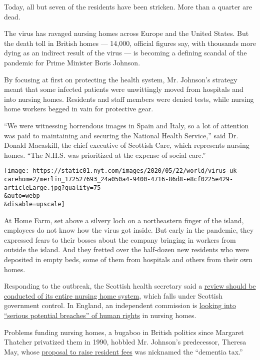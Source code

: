 Today, all but seven of the residents have been stricken. More than a
quarter are dead.

The virus has ravaged nursing homes across Europe and the United States.
But the death toll in British homes --- 14,000, official figures say,
with thousands more dying as an indirect result of the virus --- is
becoming a defining scandal of the pandemic for Prime Minister Boris
Johnson.

By focusing at first on protecting the health system, Mr. Johnson's
strategy meant that some infected patients were unwittingly moved from
hospitals and into nursing homes. Residents and staff members were
denied tests, while nursing home workers begged in vain for protective
gear.

``We were witnessing horrendous images in Spain and Italy, so a lot of
attention was paid to maintaining and securing the National Health
Service,'' said Dr. Donald Macaskill, the chief executive of Scottish
Care, which represents nursing homes. ``The N.H.S. was prioritized at
the expense of social care.''

\texttt{[image: https://static01.nyt.com/images/2020/05/22/world/virus-uk-carehome2/merlin\_172527693\_24a050a4-9400-4716-86d8-e8cf0225e429-articleLarge.jpg?quality=75\\\&auto=webp\\\&disable=upscale]}

At Home Farm, set above a silvery loch on a northeastern finger of the
island, employees do not know how the virus got inside. But early in the
pandemic, they expressed fears to their bosses about the company
bringing in workers from outside the island. And they fretted over the
half-dozen new residents who were deposited in empty beds, some of them
from hospitals and others from their own homes.

Responding to the outbreak, the Scottish health secretary said a
\href{https://www.bbc.co.uk/news/uk-scotland-52789991}{review should be
conducted of its entire nursing home system}, which falls under Scottish
government control. In England, an independent commission is
\href{https://www.telegraph.co.uk/news/2020/05/14/equalities-watchdog-considers-whether-sending-patients-hospitals/}{looking
into ``serious potential breaches'' of human rights} in nursing homes.

Problems funding nursing homes, a bugaboo in British politics since
Margaret Thatcher privatized them in 1990, hobbled Mr. Johnson's
predecessor, Theresa May, whose
\href{https://www.ft.com/content/82ff3a76-3c98-11e7-ac89-b01cc67cfeec}{proposal
to raise resident fees} was nicknamed the ``dementia tax.''

